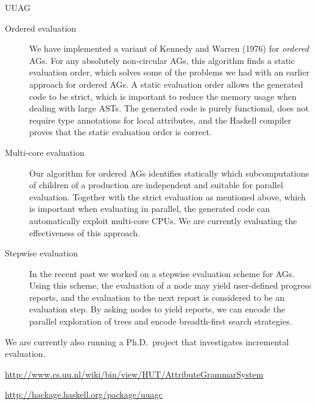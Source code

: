 \begin{hcarentry}[updated]{UUAG}
\begin{description}
\item[Ordered evaluation]
  We have implemented a variant of Kennedy and Warren (1976)
  for \emph{ordered} AGs. For any absolutely non-circular AGs, this algorithm finds a static
  evaluation order, which solves some of the problems we had with an earlier approach for
  ordered AGs. A static evaluation order allows the generated code to be strict, which is
  important to reduce the memory usage when dealing with large ASTs.
  The generated code is purely functional, does not require type
  annotations for local attributes, and the Haskell compiler proves that the static evaluation
  order is correct.

\item[Multi-core evaluation]
  Our algorithm for ordered AGs identifies statically which subcomputations of children of a
  production are independent and suitable for parallel evaluation. Together with the
  strict evaluation as mentioned above, which is important when evaluating in parallel, the
  generated code can automatically exploit multi-core CPUs. We are currently evaluating the
  effectiveness of this approach.

\item[Stepwise evaluation]
  In the recent past we worked on a stepwise evaluation scheme for AGs.
Using this scheme, the evaluation of a node may
yield user-defined progress reports, and the evaluation to the next report is
considered to be an evaluation step. By asking nodes to yield reports, we can encode
the parallel exploration of trees and encode breadth-first search strategies.
\end{description}
We are currently also running a Ph.D.\ project that investigates incremental evaluation.

\FurtherReading
\begin{compactitem}
\item
  \url{http://www.cs.uu.nl/wiki/bin/view/HUT/AttributeGrammarSystem}
\item
  \url{http://hackage.haskell.org/package/uuagc}
\end{compactitem}
\end{hcarentry}
